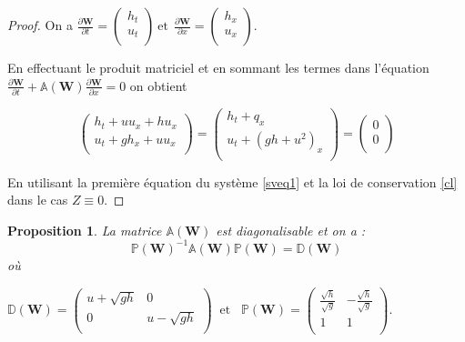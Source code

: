 \documentclass[
11pt, %
francais, %
singlespacing, %
headsepline, %
]{MastersDoctoralThesis} %
\newtheorem{prop}{Proposition}
\theoremstyle{definition}
\begin{document}
\begin{proof}

On a $\frac{\partial\textbf{W}}{\partial t}=\begin{pmatrix}
   h_{t} \\
    u_{t} \\
\end{pmatrix} ~\text{et} ~~ \frac{\partial\textbf{W}}{\partial x}=\begin{pmatrix}
   h_{x} \\
    u_{x} \\
\end{pmatrix}$.

En effectuant le produit matriciel et en sommant les termes dans l'équation  $ \frac{\partial \textbf{W}}{\partial t} +\mathbb{A}(\textbf{W}) \frac{\partial\textbf{W}}{\partial x} = 0 \label{ql} $ on obtient

$$
\begin{pmatrix}
   h_{t} + uu_{x}+hu_{x}\\
    u_{t} + gh_{x}+uu_{x}\\
\end{pmatrix} = \begin{pmatrix}
h_{t} + q_{x} \\
u_{t} + (gh+u^{2})_{x}\\
\end{pmatrix} =
\begin{pmatrix}
0 \\
0\\
\end{pmatrix}
$$

En utilisant la première équation du système \eqref{sveq1} et la loi de conservation \eqref{cl} dans le cas $Z\equiv 0$.

\end{proof}

\begin{prop}
La matrice $\mathbb{A}(\textbf{W})$ est diagonalisable et on a :
$$
\mathbb{P}(\textbf{W})^{-1}\mathbb{A}(\textbf{W})\mathbb{P}(\textbf{W})=\mathbb{D}(\textbf{W})
$$
où 

\begin{center}

$\mathbb{D}(\textbf{W}) =\begin{pmatrix}
   u+\sqrt{gh} & 0  \\
   0 & u-\sqrt{gh}  \\
\end{pmatrix} \phantom{..} \text{et}\phantom{...} \mathbb{P}(\textbf{W}) =\begin{pmatrix}
   \frac{\sqrt{h}}{\sqrt{g}} & -\frac{\sqrt{h}}{\sqrt{g}} \\
   1 & 1  \\
\end{pmatrix}.
$
\end{center}

\end{prop}
\end{document}
